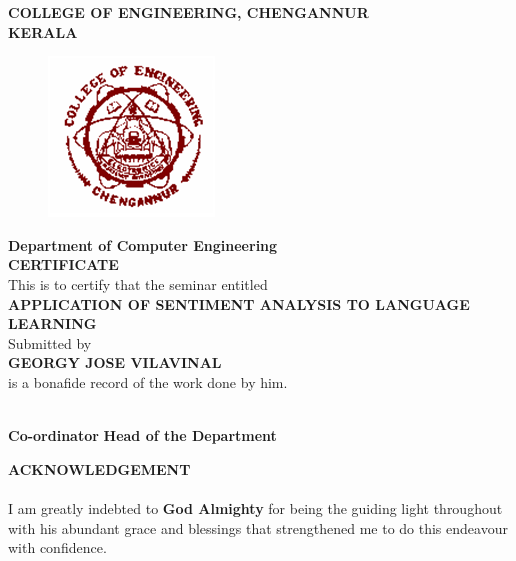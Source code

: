 \documentclass[a4paper,12pt,oneside]{article}
\begin{document}
\newpage
\thispagestyle{empty}
\begin{center}
\setlength{\baselineskip}{1.5\baselineskip}
{\large\textbf{COLLEGE OF ENGINEERING, CHENGANNUR}}
\\
{\large\textbf{KERALA}}
\\
\begin{figure}[H]
\centering
\includegraphics{ceclogo.png}
\end{figure}
\setlength{\baselineskip}{1.5\baselineskip}
\textbf{Department of Computer Engineering}
\\
\textbf{CERTIFICATE}
\\
This is to certify that the seminar entitled
\\
\textbf{APPLICATION OF SENTIMENT ANALYSIS TO LANGUAGE LEARNING}
\\
Submitted by
\\
\textbf{GEORGY JOSE VILAVINAL}
\\
is a bonafide record of the work done by him.
\end{center}
\vspace{30ex}
\hspace{55ex}
\\

\hspace{0ex}
\textbf{Co-ordinator}
\hspace{40ex}
\textbf{Head of the Department}
\newpage
{}
\renewcommand{\headrulewidth}{0.0pt}
\renewcommand{\footrulewidth}{0.0pt}
\begin{center}
\large{\textbf{ACKNOWLEDGEMENT}}
\end{center}
\vspace{6ex}
\setlength{\baselineskip}{1.5\baselineskip}
\paragraph{}
I am greatly indebted to \textbf{God Almighty} for being the guiding light throughout with his
abundant grace and blessings that strengthened me to do this endeavour with confidence.
\end{document}
